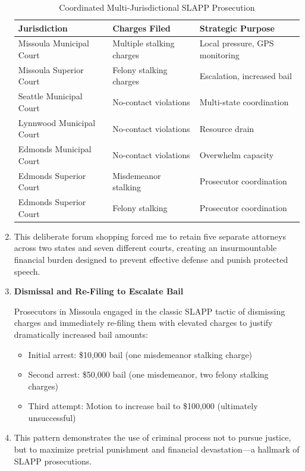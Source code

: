 \documentclass[12pt,letterpaper]{article}
\begin{document}
\begin{enumerate}
\begin{table}[h]
\begin{tabular}{|l|l|l|}
\hline
\textbf{Jurisdiction} & \textbf{Charges Filed} & \textbf{Strategic Purpose} \\
\hline
Missoula Municipal Court & Multiple stalking charges & Local pressure, GPS monitoring \\
Missoula Superior Court & Felony stalking charges & Escalation, increased bail \\
Seattle Municipal Court & No-contact violations & Multi-state coordination \\
Lynnwood Municipal Court & No-contact violations & Resource drain \\
Edmonds Municipal Court & No-contact violations & Overwhelm capacity \\
Edmonds Superior Court & Misdemeanor stalking & Prosecutor coordination \\
Edmonds Superior Court & Felony stalking & Prosecutor coordination \\
\hline
\end{tabular}
\caption{Coordinated Multi-Jurisdictional SLAPP Prosecution}
\end{table}

\item This deliberate forum shopping forced me to retain five separate attorneys across two states and seven different courts, creating an insurmountable financial burden designed to prevent effective defense and punish protected speech.

\item \textbf{Dismissal and Re-Filing to Escalate Bail}

Prosecutors in Missoula engaged in the classic SLAPP tactic of dismissing charges and immediately re-filing them with elevated charges to justify dramatically increased bail amounts:

\begin{itemize}
\item Initial arrest: \$10,000 bail (one misdemeanor stalking charge)
\item Second arrest: \$50,000 bail (one misdemeanor, two felony stalking charges)
\item Third attempt: Motion to increase bail to \$100,000 (ultimately unsuccessful)
\end{itemize}

\item This pattern demonstrates the use of criminal process not to pursue justice, but to maximize pretrial punishment and financial devastation---a hallmark of SLAPP prosecutions.


\end{enumerate}
\end{document}
